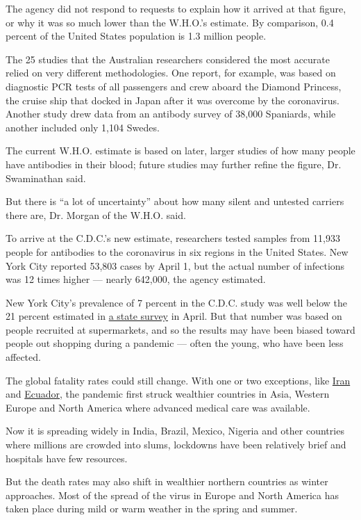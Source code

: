 The agency did not respond to requests to explain how it arrived at that
figure, or why it was so much lower than the W.H.O.'s estimate. By
comparison, 0.4 percent of the United States population is 1.3 million
people.

The 25 studies that the Australian researchers considered the most
accurate relied on very different methodologies. One report, for
example, was based on diagnostic PCR tests of all passengers and crew
aboard the Diamond Princess, the cruise ship that docked in Japan after
it was overcome by the coronavirus. Another study drew data from an
antibody survey of 38,000 Spaniards, while another included only 1,104
Swedes.

The current W.H.O. estimate is based on later, larger studies of how
many people have antibodies in their blood; future studies may further
refine the figure, Dr. Swaminathan said.

But there is ``a lot of uncertainty'' about how many silent and untested
carriers there are, Dr. Morgan of the W.H.O. said.

To arrive at the C.D.C.'s new estimate, researchers tested samples from
11,933 people for antibodies to the coronavirus in six regions in the
United States. New York City reported 53,803 cases by April 1, but the
actual number of infections was 12 times higher --- nearly 642,000, the
agency estimated.

New York City's prevalence of 7 percent in the C.D.C. study was well
below the 21 percent estimated in
\href{https://www.sciencedirect.com/science/article/pii/S1047279720302015}{a
state survey} in April. But that number was based on people recruited at
supermarkets, and so the results may have been biased toward people out
shopping during a pandemic --- often the young, who have been less
affected.

The global fatality rates could still change. With one or two
exceptions, like
\href{https://www.nytimes3xbfgragh.onion/2020/05/18/world/middleeast/iran-coronavirus-surge.html}{Iran}
and
\href{https://www.nytimes3xbfgragh.onion/2020/04/23/world/americas/ecuador-deaths-coronavirus.html}{Ecuador},
the pandemic first struck wealthier countries in Asia, Western Europe
and North America where advanced medical care was available.

Now it is spreading widely in India, Brazil, Mexico, Nigeria and other
countries where millions are crowded into slums, lockdowns have been
relatively brief and hospitals have few resources.

But the death rates may also shift in wealthier northern countries as
winter approaches. Most of the spread of the virus in Europe and North
America has taken place during mild or warm weather in the spring and
summer.

